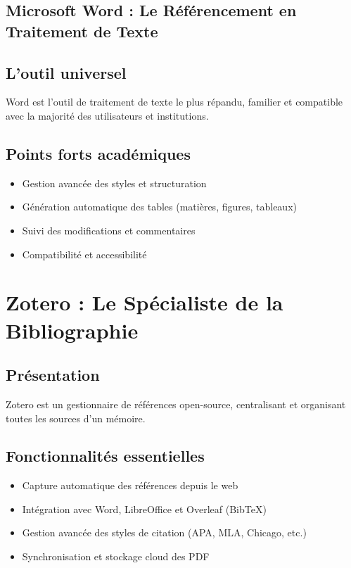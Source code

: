 \documentclass[12pt]{article}
\begin{document}
\begin{center}
\subsection*{ Microsoft Word : Le Référencement en Traitement de Texte}
\subsection*{ L'outil universel}
Word est l'outil de traitement de texte le plus répandu, familier et compatible avec la majorité des utilisateurs et institutions.

\subsection{Points forts académiques}
\begin{itemize}[leftmargin=*, label=\textbullet]
    \item Gestion avancée des styles et structuration
    \item Génération automatique des tables (matières, figures, tableaux)
    \item Suivi des modifications et commentaires
    \item Compatibilité et accessibilité
\end{itemize}


\section*{Zotero : Le Spécialiste de la Bibliographie}
\subsection*{Présentation}
Zotero est un gestionnaire de références open-source, centralisant et organisant toutes les sources d'un mémoire.

\subsection{ Fonctionnalités essentielles}
\begin{itemize}[leftmargin=*, label=\textbullet]
    \item Capture automatique des références depuis le web
    \item Intégration avec Word, LibreOffice et Overleaf (BibTeX)
    \item Gestion avancée des styles de citation (APA, MLA, Chicago, etc.)
    \item Synchronisation et stockage cloud des PDF
\end{itemize}


\end{center}
\end{document}
